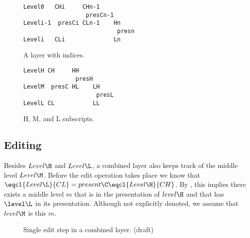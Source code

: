 \begin{figure}[h]
  \hfill
  \begin{minipage}[b]{.45\textwidth}
    \begin{center}  
\begin{small}\begin{verbatim}
Level0   CHi     CHn-1
                  presCn-1
Leveli-1  presCi CLn-1    Hn
                           presn
Leveli   CLi              Ln
\end{verbatim}\end{small}
      \caption{A layer with indices.} \label{indexedLayer}
    \end{center}
  \end{minipage}
  \hfill
  \begin{minipage}[b]{.45\textwidth}
    \begin{center}  
\begin{small}\begin{verbatim}
LevelH CH     HH
               presH
LevelM  presC HL    LH
                     presL
LevelL CL           LL
\end{verbatim}\end{small}
      \caption{H, M, and L subscripts.} \label{relativeLayer}
    \end{center}
  \end{minipage}
  \hfill
\end{figure}




\subsection{Editing} \label{sect:combinedExtra_Editing}

Besides $Level\H$ and $Level\L$, a combined layer also keeps track of the middle level $Level\M$. Before the edit operation takes place we know that $\eqcl{Level\L}{CL} = present\C \eqcl{Level\H}{CH}$. By , this implies there exists a middle level $m$ that is in the presentation of $level\H$ and that has $\level\L$ in its presentation. Although not explicitly denoted, we assume that $level\M$ is this $m$. 

\begin{figure}
 \caption{Single edit step in a combined layer. (draft)} \label{combinedEdit}
\end{figure}

